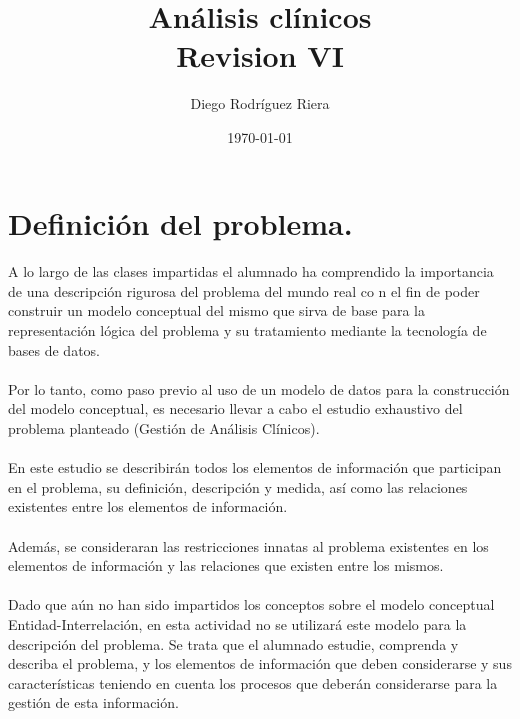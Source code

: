 \documentclass[a4paper,10pt]{article}
\title{Análisis clínicos\\{\small Revision VI}}
\author{Diego Rodríguez Riera}
\date{\today}
\begin{document}
\maketitle
\pagebreak
\tableofcontents
\pagebreak

\section{Definición del problema.}
\paragraph{}
A lo largo de las clases impartidas el alumnado ha comprendido la importancia de una descripción rigurosa del problema del mundo real co n el fin de poder construir un modelo conceptual del mismo que sirva de base para la representación lógica del problema y su tratamiento mediante la tecnología de bases de datos.
\paragraph{}
Por lo tanto, como paso previo al uso de un modelo de datos para la construcción del modelo conceptual, es necesario llevar a cabo el estudio exhaustivo del problema planteado (Gestión de Análisis Clínicos).
\paragraph{}
En este estudio se describirán todos los elementos de información que participan en el problema, su definición, descripción y medida, así como las relaciones existentes entre los elementos de información.
\paragraph{}
Además, se consideraran las restricciones innatas al problema existentes en los elementos de información y las relaciones que existen entre los mismos.
\paragraph{}
Dado que aún no han sido impartidos los conceptos sobre el modelo conceptual Entidad-Interrelación, en esta actividad no se utilizará este modelo para la descripción del problema. Se trata que el alumnado estudie, comprenda y describa el problema, y los elementos de información que deben considerarse y sus características teniendo en cuenta los procesos que deberán considerarse para la gestión de esta información.
\pagebreak
\end{document}
